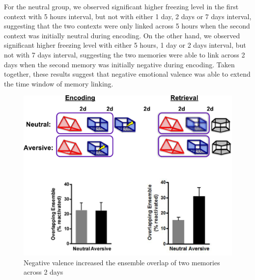 \documentclass[master.tex]{subfiles}
\begin{document}
For the neutral group, we observed significant higher freezing level in the
first context with 5 hours interval, but not with either 1 day, 2 days or 7 days
interval, suggesting that the two contexts were only linked across 5 hours when
the second context was initially neutral during encoding. On the other hand, we
observed significant higher freezing level with either 5 hours, 1 day or 2 days
interval, but not with 7 days interval, suggesting the two memories were able to
link across 2 days when the second memory was initially negative during
encoding. Taken together, these results suggest that negative emotional valence
was able to extend the time window of memory linking.


\begin{figure}[h]
  \centering \includegraphics[scale = .4]{Figures/val_retro_prelim_imag.pdf}
  \caption{\footnotesize Negative valence increased the ensemble overlap of two
    memories across 2 days}
  \label{fig:prelim_val_imag}
\end{figure}
\end{document}
